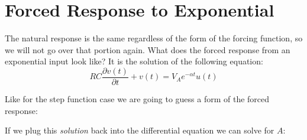 \documentclass{handout}
\begin{document}
\newpage
\clearpage
\pagebreak



\newpage
\clearpage
\pagebreak

\section{Forced Response to Exponential}
The natural response is the same regardless of the form of the forcing function, so we will not go over that portion again.  What does the forced response from an exponential input look like?  It is the solution of the following equation:
\[
RC\frac{\partial v(t)}{\partial t}+v(t) = V_Ae^{-\alpha t}u(t)
\]

Like for the step function case we are going to guess a form of the forced response:
\soln{0.75in}{
\[
v_F(t) = Ae^{-\alpha t}
\]
}

If we plug this {\em solution} back into the differential equation we can solve for $A$:
\end{document}
